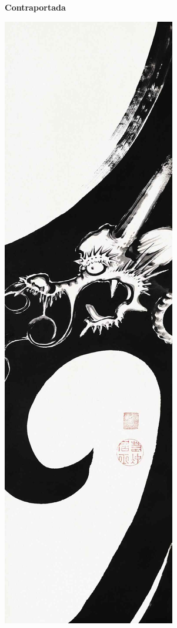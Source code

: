 \documentclass[
  a5paperpaper,
]{article}
\begin{document}
\hfill\break

\newpage

\begin{center}\textbf{Contraportada}\end{center}

\includegraphics{../img/image02.jpg}\\
\end{document}
